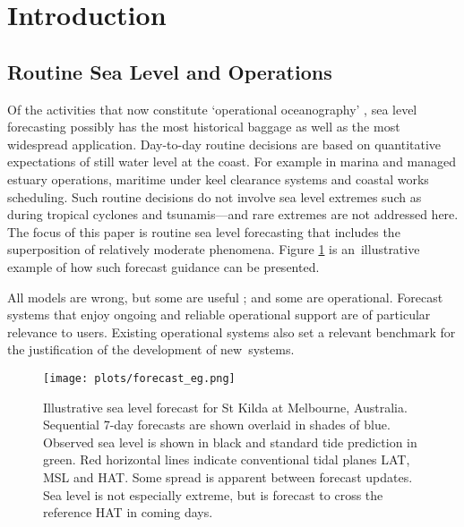 \documentclass[jmse,article,accept,moreauthors,pdftex,10pt,a4paper]{mdpi}
\begin{document}
\section{Introduction}
\vspace{-6pt}
\subsection{Routine Sea Level and Operations}

Of the activities that now constitute `operational oceanography' \cite{Bell:2009uv}, sea level forecasting possibly has the most historical baggage as well as the most widespread application.
Day-to-day routine decisions are based on quantitative expectations of still water level \cite{Pugh:2014di} at the coast.  
For example in marina and managed estuary operations, maritime under keel clearance systems and coastal works scheduling. 
Such routine decisions do not involve sea level extremes such as during tropical cyclones and tsunamis---and rare extremes are not addressed here. 
The focus of this paper is routine sea level forecasting that includes the superposition of relatively moderate phenomena.
Figure \ref{fig:fc_eg} is an~illustrative example of how such forecast guidance can be presented. 


All models are wrong, but some are useful \cite{Box:1979wz}; and some are operational.        %
Forecast systems that enjoy ongoing and reliable operational support are of particular relevance to users.
Existing operational systems also set a relevant benchmark for the justification of the development of new~systems.  

\begin{figure}[H]
\centering
\texttt{[image: plots/forecast\_eg.png]}
\caption{Illustrative sea level forecast for St Kilda at Melbourne, Australia.  Sequential 7-day forecasts are shown overlaid in shades of blue.  Observed sea level is shown in black and standard tide prediction in green.  Red horizontal lines indicate conventional tidal planes LAT, MSL and HAT.  Some spread is apparent between forecast updates.  Sea level is not especially extreme, but is forecast to cross the reference HAT in coming days.}
\label{fig:fc_eg}
\end{figure}   
\end{document}
